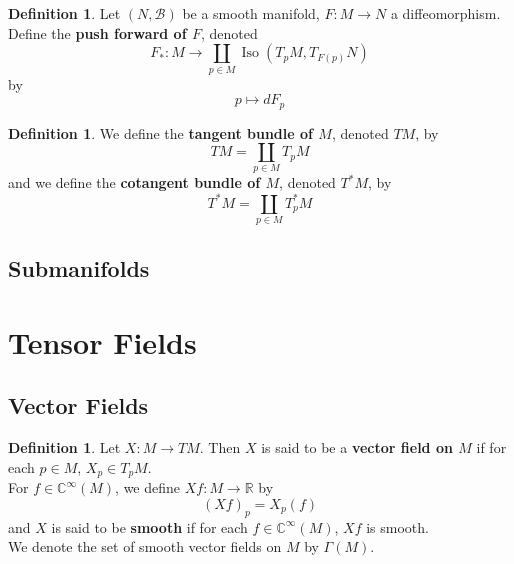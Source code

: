 \documentclass[12pt]{amsart}
\theoremstyle{definition}
\newtheorem{defn}[definition]{Definition}
\theoremstyle{remark}
\theoremstyle{definition}
\newcommand{\Gam}{\Gamma}
\newcommand{\C}{\mathbb{C}}
\newcommand{\R}{\mathbb{R}}
\newcommand{\MB}{\mathcal{B}}
\DeclareMathOperator{\iso}{Iso}
\begin{document}
	\begin{defn}
		Let $(N, \MB)$ be a smooth manifold, $F: M \rightarrow N$ a diffeomorphism. Define the \textbf{push forward of $F$}, denoted $$F_*:M \rightarrow \coprod_{p \in M} \iso(T_pM, T_{F(p)}N)$$ by $$p \mapsto dF_p$$
	\end{defn}
	
		\begin{defn}
		We define the \textbf{tangent bundle of $M$}, denoted $TM$, by $$TM = \coprod_{p \in M} T_pM$$ 
		and we define the \textbf{cotangent bundle of $M$}, denoted $T^*M$, by 
		$$T^*M = \coprod_{p \in M} T_p^*M$$
	\end{defn}
	
	
	\newpage	
	
	
	
	
	
	
	
	
	
	
	
	
	
	
	
	
	
	
	
	
	\subsection{Submanifolds}
	
	\newpage
	
	
	
	
	
	
	
	
	
	
	
	
	
	
	
	
	\section{Tensor Fields}
	\subsection{Vector Fields}
	
	\begin{defn}
		Let $X: M \rightarrow TM$. Then $X$ is said to be a \textbf{vector field on $M$} if for each $p \in M$, $X_p \in T_p M$. \\
		For $f \in \C^{\infty}(M)$, we define $Xf : M \rightarrow \R$ by $$(Xf)_p = X_p(f)$$ 
		and $X$ is said to be \textbf{smooth} if for each $f \in \C^{\infty}(M)$, $Xf$ is smooth.\\
		We denote the set of smooth vector fields on $M$ by $\Gam(M)$.
	\end{defn}
\end{document}
